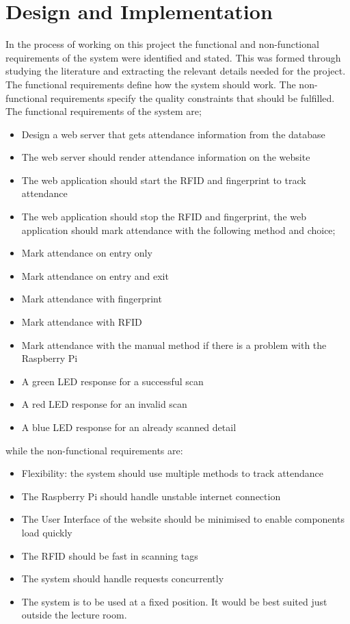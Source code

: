 \chapter{Design and Implementation}
 
\label{requirements}
In the process of working on this project the functional and non-functional requirements of the system were identified and stated. This was formed through studying the literature and extracting the relevant details needed for the project. The functional requirements define how the system should work. The non-functional requirements specify the quality constraints that should be fulfilled. The functional requirements of the system are;
\begin{itemize}
\item Design a web server that gets attendance information from the database
\item The web server should render attendance information on the website
\item The web application should start the \gls{RFID} and fingerprint to track attendance
\item The web application should stop the \gls{RFID} and fingerprint, the web application should mark attendance with the following method and choice;
\item Mark attendance on entry only
\item Mark attendance on entry and exit
\item Mark attendance with fingerprint
\item Mark attendance with \gls{RFID}
\item Mark attendance with the manual method if there is a problem with the Raspberry Pi
\item A green LED response for a successful scan
\item A red LED response for an invalid scan
\item A blue LED response for an already scanned detail
\end{itemize}
while the non-functional requirements are:
\begin{itemize}
\item Flexibility: the system should use multiple methods to track attendance
\item The Raspberry Pi should handle unstable internet connection
\item The User Interface of the website should be minimised to enable components load quickly
\item The \gls{RFID} should be fast in scanning tags
\item The system should handle requests concurrently
\item The system is to be used at a fixed position. It would be best suited just outside the lecture room.
\end{itemize}


